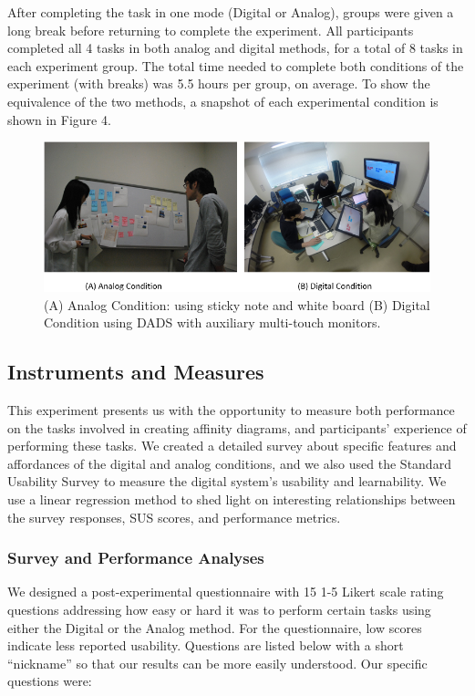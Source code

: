 \documentclass{sigchi}
\begin{document}
After completing the task in one mode (Digital or Analog), groups were given a long break before returning to complete the experiment. All participants completed all 4 tasks in both analog and digital methods, for a total of 8 tasks in each experiment group. The total time needed to complete both conditions of the experiment (with breaks) was 5.5 hours per group, on average. To show the equivalence of the two methods, a snapshot of each experimental condition is shown in Figure 4.

\begin{figure}[!h]
\centering
\includegraphics[width=1.0\columnwidth]{condition}
\caption{(A) Analog Condition: using sticky note and white board (B) Digital Condition using DADS with auxiliary multi-touch monitors.}
\label{fig:figure1}
\end{figure}

\subsection{Instruments and Measures}

This experiment presents us with the opportunity to measure both performance on the tasks involved in creating affinity diagrams, and participants' experience of performing these tasks. We created a detailed survey about specific features and affordances of the digital and analog conditions, and we also used the Standard Usability Survey to measure the digital system's usability and learnability. We use a linear regression method to shed light on interesting relationships between the survey responses, SUS scores, and performance metrics.

\subsubsection{Survey and Performance Analyses}

We designed a post-experimental questionnaire with 15 1-5 Likert scale rating questions addressing how easy or hard it was to perform certain tasks using either the Digital or the Analog method. For the questionnaire, low scores indicate less reported usability. Questions are listed below with a short ``nickname'' so that our results can be more easily understood. Our specific questions were:
\end{document}
